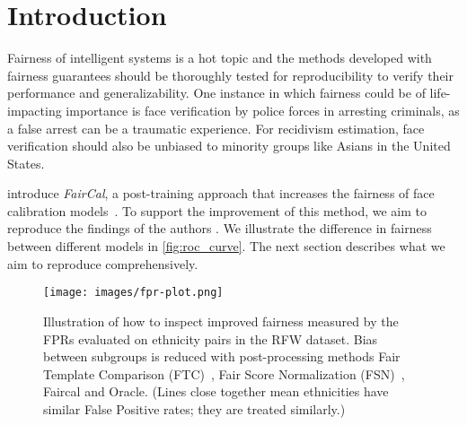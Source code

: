 

\section{Introduction}


Fairness of intelligent systems is a hot topic and the methods developed with fairness guarantees  should be thoroughly tested for reproducibility to verify their performance and generalizability.
One instance in which fairness could be of life-impacting importance is face verification by police forces in arresting criminals, as a false arrest can be a traumatic experience.
For recidivism estimation, face verification should also be unbiased to minority groups like Asians in the United States.

\citeauthor{salvador2022faircal} introduce \textit{FairCal}, a post-training approach that increases the fairness of face calibration models~\cite{salvador2022faircal}.
To support the improvement of this method, we aim to reproduce the findings of the authors%
. We illustrate the difference in fairness between different models in \autoref{fig:roc_curve}.
The next section describes what we aim to reproduce comprehensively.

\begin{figure}[h]
    \centering
    \texttt{[image: images/fpr-plot.png]}
    \caption{Illustration of how to inspect improved fairness measured by the FPRs evaluated on ethnicity pairs in the RFW dataset. Bias between subgroups is reduced with post-processing methods Fair Template Comparison (FTC)~\cite{terhorst2020comparison}, Fair Score Normalization (FSN)~\cite{terhorst2020post}, Faircal and Oracle. (Lines close together mean ethnicities have similar False Positive rates; they are treated similarly.)}
    \label{fig:roc_curve}
\end{figure}

